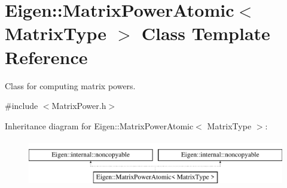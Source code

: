 \hypertarget{class_eigen_1_1_matrix_power_atomic}{}\section{Eigen\+:\+:Matrix\+Power\+Atomic$<$ Matrix\+Type $>$ Class Template Reference}
\label{class_eigen_1_1_matrix_power_atomic}


Class for computing matrix powers.  




{\ttfamily \#include $<$Matrix\+Power.\+h$>$}

Inheritance diagram for Eigen\+:\+:Matrix\+Power\+Atomic$<$ Matrix\+Type $>$\+:\begin{figure}[H]
\begin{center}
\leavevmode
\includegraphics[height=2.000000cm]{class_eigen_1_1_matrix_power_atomic}
\end{center}
\end{figure}
